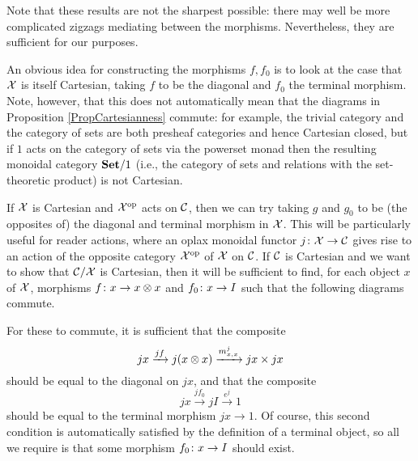 Note that these results are not the sharpest possible: there may well be more complicated zigzags mediating between the morphisms.
Nevertheless, they are sufficient for our purposes.

An obvious idea for constructing the morphisms $f,f_0$ is to look at the case that $\mathcal X$ is itself Cartesian, taking $f$ to be the diagonal and $f_0$ the terminal morphism.
Note, however, that this does not automatically mean that the diagrams in Proposition \ref{PropCartesianness} commute: for example, the trivial category and the category of sets are both presheaf categories and hence Cartesian closed, but if $1$ acts on the category of sets via the powerset monad then the resulting monoidal category ${\normalfont\textbf{Set}}/1$ (i.e., the category of sets and relations with the set-theoretic product) is not Cartesian.

If $\mathcal X$ is Cartesian and $\mathcal X^{\mathrm{op}}$ acts on ${\mathcal{C}}$, then we can try taking $g$ and $g_0$ to be (the opposites of) the diagonal and terminal morphism in $\mathcal X$.
This will be particularly useful for reader actions, where an oplax monoidal functor $j\colon \mathcal X \to {\mathcal{C}}$ gives rise to an action of the opposite category $\mathcal X^{\mathrm{op}}$ of $\mathcal X$ on ${\mathcal{C}}$.  
If ${\mathcal{C}}$ is Cartesian and we want to show that ${\mathcal{C}}/\mathcal X$ is Cartesian, then it will be sufficient to find, for each object $x$ of $\mathcal X$, morphisms $f \colon x \to x\otimes x$ and $f_0 \colon x \to I$ such that the following diagrams commute.
For these to commute, it is sufficient that the composite
\[
  jx \xrightarrow{jf} j(x \otimes x) \xrightarrow{m^j_{x,x}} jx \times jx
  \]
should be equal to the diagonal on $jx$, and that the composite
\[
  jx \xrightarrow{jf_0} jI \xrightarrow{e^j} 1
  \]
should be equal to the terminal morphism $jx \to 1$.  
Of course, this second condition is automatically satisfied by the definition of a terminal object, so all we require is that some morphism $f_0 \colon x \to I$ should exist.


